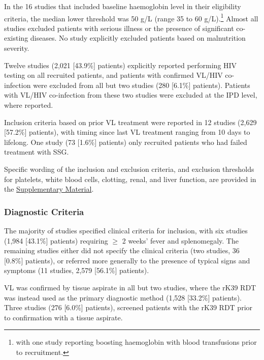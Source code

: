 In the 16 studies that included baseline haemoglobin level in their eligibility criteria, the median lower threshold was 50 g/L (range 35 to 60 g/L).\footnote{with one study reporting boosting haemoglobin with blood transfusions prior to recruitment\cite{das2009}.} Almost all studies excluded patients with serious illness or the presence of significant co-existing diseases. No study explicitly excluded patients based on malnutrition severity.

Twelve studies (2,021 [43.9\%] patients) explicitly reported performing HIV testing on all recruited patients\cite{koirala2003,bhattacharya2007,chakraborty2008,rijal2013,rijal2010a,sundar2007a,sundar2008,sundar2008B,sundar2009,sundar2010,sundar2014,sundar2015}, and patients with confirmed VL/HIV co-infection were excluded from all but two studies (280 [6.1\%] patients)\cite{rijal2003,rijal2010b}. Patients with VL/HIV co-infection from these two studies were excluded at the IPD level, where reported.

Inclusion criteria based on prior VL treatment were reported in 12 studies (2,629 [57.2\%] patients)\cite{sundar2019,sundar2015,sundar2014,sundar2011,sundar2010,sundar2009,sundar2008B,sundar2007a,rijal2010b,rijal2010a,rijal2003,das2009}, with timing since last VL treatment ranging from 10 days\cite{sundar2008B} to lifelong\cite{sundar2019}. One study (73 [1.6\%] patients) only recruited patients who had failed treatment with SSG\cite{das2009}.

Specific wording of the inclusion and exclusion criteria, and exclusion thresholds for platelets, white blood cells, clotting, renal, and liver function, are provided in the \href{https://github.com/jpwil/dphil}{Supplementary Material}.

\subsubsection{Diagnostic Criteria}

The majority of studies specified clinical criteria for inclusion, with six studies (1,984 [43.1\%] patients) requiring $\geq$ 2 weeks' fever and splenomegaly\cite{sundar2019,sundar2014,rijal2010b,rijal2010a,rijal2003,pandey2016}. The remaining studies either did not specify the clinical criteria (two studies, 36 [0.8\%] patients)\cite{chakraborty2008,sundar2015}, or referred more generally to the presence of typical signs and symptoms (11 studies, 2,579 [56.1\%] patients).

VL was confirmed by tissue aspirate in all but two studies, where the rK39 RDT was instead used as the primary diagnostic method (1,528 [33.2\%] patients)\cite{pandey2016,sundar2019}. Three studies (276 [6.0\%] patients)\cite{pandey2017,rijal2010a,sundar2014}, screened patients with the rK39 RDT prior to confirmation with a tissue aspirate.

